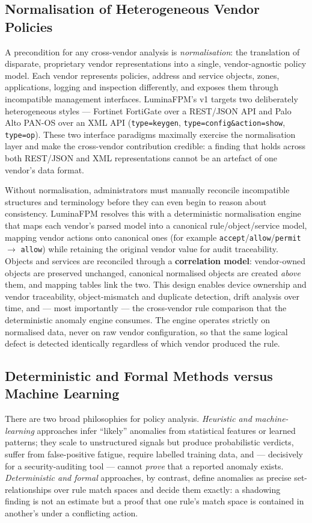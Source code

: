 \documentclass[12pt,a4paper]{report}
\renewcommand{\_}{\textunderscore\allowbreak}
\begin{document}
\subsection{Normalisation of Heterogeneous Vendor Policies}
A precondition for any cross-vendor analysis is \emph{normalisation}: the translation of disparate, proprietary vendor representations into a single, vendor-agnostic policy model. Each vendor represents policies, address and service objects, zones, applications, logging and inspection differently, and exposes them through incompatible management interfaces. LuminaFPM's v1 targets two deliberately heterogeneous styles --- Fortinet FortiGate over a REST/JSON API and Palo Alto PAN-OS over an XML API (\texttt{type=keygen}, \texttt{type=config\&action=show}, \texttt{type=op}). These two interface paradigms maximally exercise the normalisation layer and make the cross-vendor contribution credible: a finding that holds across both REST/JSON and XML representations cannot be an artefact of one vendor's data format.

Without normalisation, administrators must manually reconcile incompatible structures and terminology before they can even begin to reason about consistency. LuminaFPM resolves this with a deterministic normalisation engine that maps each vendor's parsed model into a canonical rule/object/service model, mapping vendor actions onto canonical ones (for example \texttt{accept}/\texttt{allow}/\texttt{permit} $\rightarrow$ \texttt{allow}) while retaining the original vendor value for audit traceability. Objects and services are reconciled through a \textbf{correlation model}: vendor-owned objects are preserved unchanged, canonical normalised objects are created \emph{above} them, and mapping tables link the two. This design enables device ownership and vendor traceability, object-mismatch and duplicate detection, drift analysis over time, and --- most importantly --- the cross-vendor rule comparison that the deterministic anomaly engine consumes. The engine operates strictly on normalised data, never on raw vendor configuration, so that the same logical defect is detected identically regardless of which vendor produced the rule.

\subsection{Deterministic and Formal Methods versus Machine Learning}
There are two broad philosophies for policy analysis. \emph{Heuristic and machine-learning} approaches infer ``likely'' anomalies from statistical features or learned patterns; they scale to unstructured signals but produce probabilistic verdicts, suffer from false-positive fatigue, require labelled training data, and --- decisively for a security-auditing tool --- cannot \emph{prove} that a reported anomaly exists. \emph{Deterministic and formal} approaches, by contrast, define anomalies as precise set-relationships over rule match spaces and decide them exactly: a shadowing finding is not an estimate but a proof that one rule's match space is contained in another's under a conflicting action.
\end{document}
